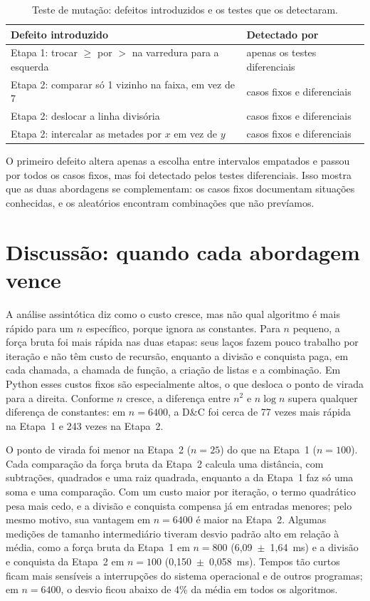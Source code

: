 \documentclass[11pt,a4paper]{article}
\begin{document}
\begin{table}[H]
\centering\small
\begin{tabular}{p{}l}
\toprule
Defeito introduzido & Detectado por \\
\midrule
Etapa 1: trocar $\geq$ por $>$ na varredura para a esquerda & apenas os testes diferenciais \\
Etapa 2: comparar só 1 vizinho na faixa, em vez de 7 & casos fixos e diferenciais \\
Etapa 2: deslocar a linha divisória & casos fixos e diferenciais \\
Etapa 2: intercalar as metades por $x$ em vez de $y$ & casos fixos e diferenciais \\
\bottomrule
\end{tabular}
\caption{Teste de mutação: defeitos introduzidos e os testes que os detectaram.}
\label{tab:mutacao}
\end{table}

O primeiro defeito altera apenas a escolha entre intervalos empatados e passou por todos os casos fixos, mas foi detectado pelos testes diferenciais. Isso mostra que as duas abordagens se complementam: os casos fixos documentam situações conhecidas, e os aleatórios encontram combinações que não prevíamos.

\section{Discussão: quando cada abordagem vence}

A análise assintótica diz como o custo cresce, mas não qual algoritmo é mais rápido para um $n$ específico, porque ignora as constantes. Para $n$ pequeno, a força bruta foi mais rápida nas duas etapas: seus laços fazem pouco trabalho por iteração e não têm custo de recursão, enquanto a divisão e conquista paga, em cada chamada, a chamada de função, a criação de listas e a combinação. Em Python esses custos fixos são especialmente altos, o que desloca o ponto de virada para a direita. Conforme $n$ cresce, a diferença entre $n^2$ e $n\log n$ supera qualquer diferença de constantes: {em $n = 6400$, a D\&C foi cerca de 77 vezes mais rápida na Etapa~1 e 243 vezes na Etapa~2}.

{O ponto de virada foi menor na Etapa~2 ($n = 25$) do que na Etapa~1 ($n = 100$). Cada comparação da força bruta da Etapa~2 calcula uma distância, com subtrações, quadrados e uma raiz quadrada, enquanto a da Etapa~1 faz só uma soma e uma comparação. Com um custo maior por iteração, o termo quadrático pesa mais cedo, e a divisão e conquista compensa já em entradas menores; pelo mesmo motivo, sua vantagem em $n = 6400$ é maior na Etapa~2. Algumas medições de tamanho intermediário tiveram desvio padrão alto em relação à média, como a força bruta da Etapa~1 em $n = 800$ (6,09~$\pm$~1,64~ms) e a divisão e conquista da Etapa~2 em $n = 100$ (0,150~$\pm$~0,058~ms). Tempos tão curtos ficam mais sensíveis a interrupções do sistema operacional e de outros programas; em $n = 6400$, o desvio ficou abaixo de 4\% da média em todos os algoritmos.}
\end{document}
